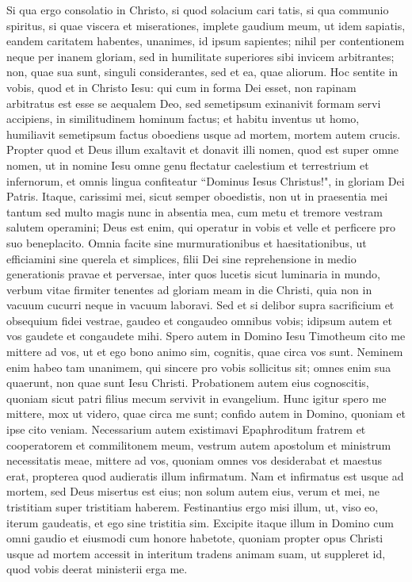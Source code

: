 \begin{biblechapter}  
\verse Si qua ergo consolatio in Christo, si quod solacium cari tatis, si qua communio spiritus, si quae viscera et miserationes, 
\verse implete gaudium meum, ut idem sapiatis, eandem caritatem habentes, unanimes, id ipsum sapientes; 
\verse nihil per contentionem neque per inanem gloriam, sed in humilitate superiores sibi invicem arbitrantes; 
\verse non, quae sua sunt, singuli considerantes, sed et ea, quae aliorum. 
\verse Hoc sentite in vobis, quod et in Christo Iesu: 
\verse qui cum in forma Dei esset, non rapinam arbitratus est esse se aequalem Deo, 
\verse sed semetipsum exinanivit formam servi accipiens, in similitudinem hominum factus; et habitu inventus ut homo, 
\verse humiliavit semetipsum factus oboediens usque ad mortem, mortem autem crucis. 
\verse Propter quod et Deus illum exaltavit et donavit illi nomen, quod est super omne nomen, 
\verse ut in nomine Iesu omne genu flectatur caelestium et terrestrium et infernorum, 
\verse et omnis lingua confiteatur “Dominus Iesus Christus!", in gloriam Dei Patris. 
\verse Itaque, carissimi mei, sicut semper oboedistis, non ut in praesentia mei tantum sed multo magis nunc in absentia mea, cum metu et tremore vestram salutem operamini; 
\verse Deus est enim, qui operatur in vobis et velle et perficere pro suo beneplacito. 
\verse Omnia facite sine murmurationibus et haesitationibus,  
\verse ut efficiamini sine querela et simplices, filii Dei sine reprehensione in medio generationis pravae et perversae, inter quos lucetis sicut luminaria in mundo, 
\verse verbum vitae firmiter tenentes ad gloriam meam in die Christi, quia non in vacuum cucurri neque in vacuum laboravi. 
\verse Sed et si delibor supra sacrificium et obsequium fidei vestrae, gaudeo et congaudeo omnibus vobis;  
\verse idipsum autem et vos gaudete et congaudete mihi. 
\verse Spero autem in Domino Iesu Timotheum cito me mittere ad vos, ut et ego bono animo sim, cognitis, quae circa vos sunt. 
\verse Neminem enim habeo tam unanimem, qui sincere pro vobis sollicitus sit; 
\verse omnes enim sua quaerunt, non quae sunt Iesu Christi.  
\verse Probationem autem eius cognoscitis, quoniam sicut patri filius mecum servivit in evangelium. 
\verse Hunc igitur spero me mittere, mox ut videro, quae circa me sunt; 
\verse confido autem in Domino, quoniam et ipse cito veniam. 
\verse Necessarium autem existimavi Epaphroditum fratrem et cooperatorem et commilitonem meum, vestrum autem apostolum et ministrum necessitatis meae, mittere ad vos, 
\verse quoniam omnes vos desiderabat et maestus erat, propterea quod audieratis illum infirmatum. 
\verse Nam et infirmatus est usque ad mortem, sed Deus misertus est eius; non solum autem eius, verum et mei, ne tristitiam super tristitiam haberem. 
\verse Festinantius ergo misi illum, ut, viso eo, iterum gaudeatis, et ego sine tristitia sim. 
\verse Excipite itaque illum in Domino cum omni gaudio et eiusmodi cum honore habetote, 
\verse quoniam propter opus Christi usque ad mortem accessit in interitum tradens animam suam, ut suppleret id, quod vobis deerat ministerii erga me. 
\end{biblechapter}

